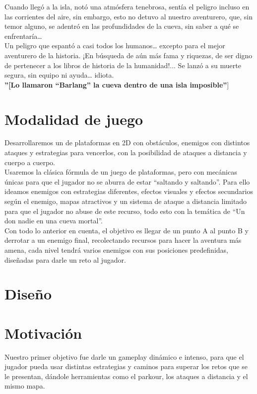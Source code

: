 \documentclass{article}
\begin{document}
Cuando llegó a la isla, notó una atmósfera tenebrosa, sentía el peligro incluso en las corrientes del aire, sin embargo, esto no detuvo al nuestro aventurero, que, sin temor alguno, se adentró en las profundidades de la cueva, sin saber a qué se enfrentaría…\\

Un peligro que espantó a casi todos los humanos… excepto para el mejor aventurero de la historia. ¡En búsqueda de aún más fama y riquezas, de ser digno de pertenecer a los libros de historia de la humanidad!... Se lanzó a su muerte segura, sin equipo ni ayuda… idiota.\\

\textbf{''[Lo llamaron “Barlang” la cueva dentro de una isla imposible''}]\\


\section{Modalidad de juego}
Desarrollaremos un de plataformas en 2D con obstáculos, enemigos con distintos ataques y estrategias para vencerlos, con la posibilidad de ataques a distancia y cuerpo a cuerpo.\\

Usaremos la clásica fórmula de un juego de plataformas, pero con mecánicas únicas para que el jugador no se aburra de estar “saltando y saltando”. Para ello ideamos enemigos con estrategias diferentes, efectos visuales y efectos secundarios según el enemigo, mapas atractivos y un sistema de ataque a distancia limitado para que el jugador no abuse de este recurso, todo esto con la temática de “Un don nadie en una cueva mortal”.\\

Con todo lo anterior en cuenta, el objetivo es llegar de un punto A al punto B y derrotar a un enemigo final, recolectando recursos para hacer la aventura más amena, cada nivel tendrá varios enemigos con sus posiciones predefinidas, diseñadas para darle un reto al jugador.

\section{Diseño}


\section{Motivación}
Nuestro primer objetivo fue darle un gameplay dinámico e intenso, para que el jugador pueda usar distintas estrategias y caminos para superar los retos que se le presentan, dándole herramientas como el parkour, los ataques a distancia y el mismo mapa.\\
\end{document}
